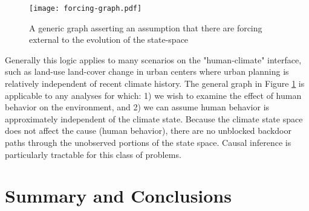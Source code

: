 \documentclass[12pt]{article}
\begin{document}
\begin{figure}
  \texttt{[image: forcing-graph.pdf]}
  \caption{A generic graph asserting an assumption that there are
    forcing external to the evolution of the state-space}
  \label{fig:forcing}
\end{figure}

Generally this logic applies to many scenarios on the "human-climate"
interface, such as land-use land-cover change in urban centers where
urban planning is relatively independent of recent climate
history. The general graph in Figure \ref{fig:forcing} is applicable
to any analyses for which: 1) we wish to examine the effect of human
behavior on the environment, and 2) we can assume human behavior is
approximately independent of the climate state. Because the climate
state space does not affect the cause (human behavior), there are no
unblocked backdoor paths through the unobserved portions of the state
space. Causal inference is particularly tractable for this class of
problems.

\section{Summary and Conclusions}
\end{document}
